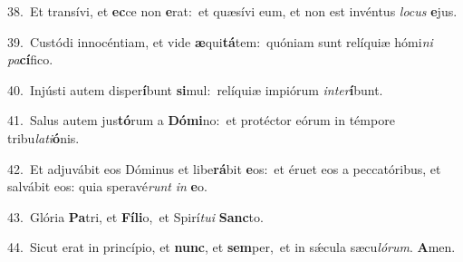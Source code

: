 {\numbfont\textcolor{\numbcolor}{38.}}~Et transívi, et \textbf{ec}\-ce non \textbf{e}\-rat:~\star et quæsívi eum, et non est invéntus \textit{lo}\-\textit{cus} \textbf{e}\-jus.\par
{\numbfont\textcolor{\numbcolor}{39.}}~Custódi innocéntiam, et vide \textbf{æ}\-qui\-\textbf{tá}\-tem:~\star quóniam sunt relíquiæ hómi\textit{ni} \textit{pa}\-\textbf{cí}fico.\par
{\numbfont\textcolor{\numbcolor}{40.}}~Injústi autem disper\-\textbf{í}\-bunt \textbf{si}\-mul:~\star relíquiæ impiórum \textit{in}\-\textit{ter}\textbf{í}bunt.\par
{\numbfont\textcolor{\numbcolor}{41.}}~Salus autem jus\-\textbf{tó}\-rum a \textbf{Dó}\-\textbf{mi}no:~\star et protéctor eórum in témpore tribu\-\textit{la}\-\textit{ti}\textbf{ó}nis.\par
{\numbfont\textcolor{\numbcolor}{42.}}~Et adjuvábit eos Dóminus et libe\-\textbf{rá}\-bit \textbf{e}\-os:~\star et éruet eos a peccatóribus, et salvábit eos: quia speravé\textit{runt} \textit{in} \textbf{e}\-o.\par
{\numbfont\textcolor{\numbcolor}{43.}}~Glória \textbf{Pa}\-tri, et \textbf{Fí}\-\textbf{li}o,~\star et Spirí\-\textit{tu}\-\textit{i} \textbf{Sanc}\-to.\par
{\numbfont\textcolor{\numbcolor}{44.}}~Sicut erat in princípio, et \textbf{nunc}\-, et \textbf{sem}\-per,~\star et in sǽcula sæcu\-\textit{ló}\-\textit{rum}. \textbf{A}\-men.\par
